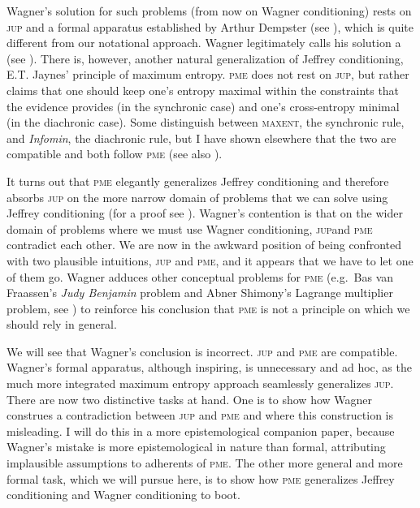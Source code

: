 \documentclass[11pt]{article}
\begin{document}
Wagner's solution for such problems (from now on Wagner conditioning)
rests on \textsc{jup} and a formal apparatus established by Arthur
Dempster (see ), which is quite different from
our notational approach. Wagner legitimately calls his solution a
 (see
). There is, however, another natural
generalization of Jeffrey conditioning, E.T. Jaynes' principle of
maximum entropy. \textsc{pme} does not rest on \textsc{jup}, but
rather claims that one should keep one's entropy maximal within the
constraints that the evidence provides (in the synchronic case) and
one's cross-entropy minimal (in the diachronic case). Some distinguish
between \textsc{maxent}, the synchronic rule, and \emph{Infomin}, the
diachronic rule, but I have shown elsewhere that the two are
compatible and both follow \textsc{pme} (see also
).

It turns out that \textsc{pme} elegantly generalizes Jeffrey
conditioning and therefore absorbs \textsc{jup} on the more narrow
domain of problems that we can solve using Jeffrey conditioning (for a
proof see ). Wagner's contention is that
on the wider domain of problems where we must use Wagner conditioning,
\textsc{jup}and \textsc{pme} contradict each other. We are now in the
awkward position of being confronted with two plausible intuitions,
\textsc{jup} and \textsc{pme}, and it appears that we have to let one
of them go. Wagner adduces other conceptual problems for \textsc{pme}
(e.g.\ Bas van Fraassen's \emph{Judy Benjamin} problem and Abner
Shimony's Lagrange multiplier problem, see
) to reinforce his conclusion that
\textsc{pme} is not a principle on which we should rely in general.

We will see that Wagner's conclusion is incorrect. \textsc{jup} and
\textsc{pme} are compatible. Wagner's formal apparatus, although
inspiring, is unnecessary and ad hoc, as the much more integrated
maximum entropy approach seamlessly generalizes \textsc{jup}. There
are now two distinctive tasks at hand. One is to show how Wagner
construes a contradiction between \textsc{jup} and \textsc{pme} and
where this construction is misleading. I will do this in a more
epistemological companion paper, because Wagner's mistake is more
epistemological in nature than formal, attributing implausible
assumptions to adherents of \textsc{pme}. The other more general and
more formal task, which we will pursue here, is to show how
\textsc{pme} generalizes Jeffrey conditioning and Wagner conditioning
to boot.
\end{document}

